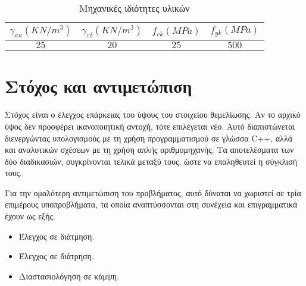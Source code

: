 \begin{table}[H]
\en
\centering
\begin{tabular}{| c | c | c | c |}
\hline
${\gamma}_{\sigma\kappa}(KN/m^3)$ & ${\gamma}_{\varepsilon\delta}(KN/m^3)$ & $f_{ck}(MPa)$ & $f_{yk}(MPa)$ \\
\hline
$25$ & $20$ & $25$ & $500$ \\
\hline
\end{tabular}
\el
\caption{Μηχανικές ιδιότητες υλικών}
\end{table}

\section{Στόχος και αντιμετώπιση}
Στόχος είναι ο έλεγχος επάρκειας του ύψους του στοιχείου θεμελίωσης. Αν το αρχικό ύψος δεν προσφέρει ικανοποιητική αντοχή, τότε επιλέγεται νέο. Αυτό διαπιστώνεται διενεργώντας υπολογισμούς με τη χρήση προγραμματισμού σε γλώσσα \textlatin{C++}, αλλά και αναλυτικών σχέσεων με τη χρήση απλής αριθμομηχανής. Τα αποτελέσματα των δύο διαδικασιών, συγκρίνονται τελικά μεταξύ τους, ώστε να επαληθευτεί η σύγκλισή τους.

Για την ομαλότερη αντιμετώπιση του προβλήματος, αυτό δύναται να χωριστεί σε τρία επιμέρους υποπροβλήματα, τα οποία αναπτύσσονται στη συνέχεια και επιγραμματικά έχουν ως εξής.

\begin{itemize}
  \item Έλεγχος σε διάτμηση.
  \item Έλεγχος σε διάτρηση.
  \item Διαστασιολόγηση σε κάμψη.
\end{itemize}
